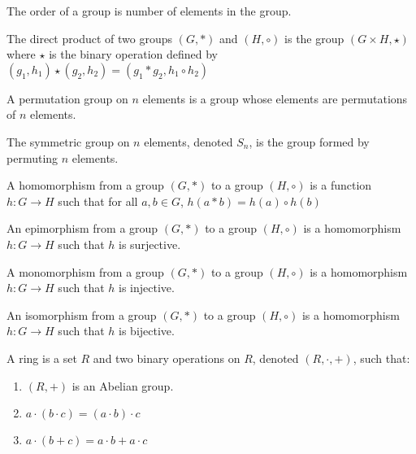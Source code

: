     \begin{definition}
        The order of a group is number of elements in the
        group.
    \end{definition}
    \begin{definition}
        The direct product of two groups $(G,*)$ and
        $(H,\circ)$ is the group  $({G}\times{H},\star)$
        where $\star$ is the binary operation defined by
        $(g_{1},h_{1})\star(g_{2},h_{2})%
         =(g_{1}*g_{2},{h_{1}}\circ{h_{2}})$
    \end{definition}
    \begin{definition}
        A permutation group on $n$ elements is a
        group whose elements are permutations of
        $n$ elements.
    \end{definition}
    \begin{definition}
        The symmetric group on $n$ elements,
        denoted $S_{n}$, is the group formed by
        permuting $n$ elements.
    \end{definition}
    \begin{definition}
        A homomorphism from a group $(G,*)$ to
        a group $(H,\circ)$ is a function
        $h:{G}\rightarrow{H}$ such that for all
        ${a,b}\in{G}$, $h(a*b)={h(a)}\circ{h(b)}$
    \end{definition}
    \begin{definition}
        An epimorphism from a group $(G,*)$ to
        a group $(H,\circ)$ is a homomorphism
        $h:{G}\rightarrow{H}$ such that
        $h$ is surjective.
    \end{definition}
    \begin{definition}
        A monomorphism from a group $(G,*)$ to
        a group $(H,\circ)$ is a homomorphism
        $h:{G}\rightarrow{H}$ such that
        $h$ is injective.
    \end{definition}
    \begin{definition}
        An isomorphism from a group $(G,*)$ to
        a group $(H,\circ)$ is a homomorphism
        $h:{G}\rightarrow{H}$ such that
        $h$ is bijective.
    \end{definition}
    \begin{definition}
        A ring is a set $R$ and two binary operations
        on $R$, denoted $(R,\cdot,+)$, such that:
        \begin{enumerate}
            \item $(R,+)$ is an Abelian group.
            \item $a\cdot({b}\cdot{c})=({a}\cdot{b})\cdot{c}$
            \item ${a}\cdot(b+c)={a}\cdot{b}+{a}\cdot{c}$
        \end{enumerate}
    \end{definition}

